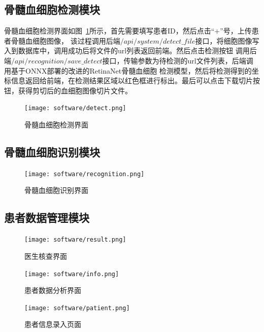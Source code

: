 \subsection{骨髓血细胞检测模块}
骨髓血细胞检测界面如图~\ref{fig:interface_detect}所示，首先需要填写患者ID，然后点击“+”号，上传患者骨髓血细胞图像，
该过程调用后端$/api/system/detect\_file$接口，将细胞图像写入到数据库中，调用成功后将文件的url列表返回前端。然后点击检测按钮
调用后端$/api/recognition/save\_detect$接口，传输参数为待检测的url文件列表，后端调用基于ONNX部署的改进的RetinaNet骨髓血细胞
检测模型，然后将检测得到的坐标信息返回给前端，在检测结果区域以红色框进行标出。最后可以点击下载切片按钮，获得剪切后的血细胞图像切片文件。
\begin{figure}[htbp]                     
  \centering                      
  \texttt{[image: software/detect.png]}                      
  \caption{骨髓血细胞检测界面}                      
  \label{fig:interface_detect}       
\end{figure}
\subsection{骨髓血细胞识别模块}
\begin{figure}[htbp]                     
  \centering                      
  \texttt{[image: software/recognition.png]}                      
  \caption{骨髓血细胞识别界面}                      
  \label{fig:interface_recog}       
\end{figure}

\subsection{患者数据管理模块}
\begin{figure}[htbp]                     
  \centering                      
  \texttt{[image: software/result.png]}                      
  \caption{医生核查界面}                      
  \label{fig:interface_result}       
\end{figure}

\begin{figure}[htbp]                     
  \centering                      
  \texttt{[image: software/info.png]}                      
  \caption{患者数据分析界面}                      
  \label{fig:interface_info}       
\end{figure}

\begin{figure}[htbp]                     
  \centering                      
  \texttt{[image: software/patient.png]}                      
  \caption{患者信息录入页面}                      
  \label{fig:interface_patient}       
\end{figure}
\


